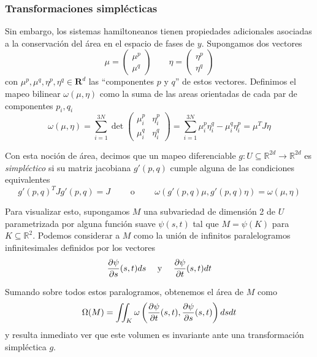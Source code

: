 \subsubsection{Transformaciones simplécticas}{\label{sec:trans_simp}}

Sin embargo, los sistemas hamiltoneanos tienen propiedades adicionales asociadas a la conservación del área en el espacio de fases de $y$. 
Supongamos dos vectores 
\[ \mu = \begin{pmatrix} \mu^p\\ \mu^q \end{pmatrix} \qquad \eta = \begin{pmatrix} \eta^p\\ \eta^q \end{pmatrix}  \]
con $\mu^p, \mu^q, \eta^p, \eta^q\in\mathbf{R}^{d}$ las ``componentes $p$ y $q$'' de estos vectores.
Definimos el mapeo bilinear $\omega(\mu,\eta)$ como la suma de las areas orientadas de cada par de componentes $p_i,q_i$ 
\begin{equation}
 \omega(\mu, \eta) = \sum_{i=1}^{3N} \det \begin{pmatrix} \mu^p_i & \eta^p_i \\ \mu^q_i & \eta^q_i \end{pmatrix} = \sum_{i=1}^{3N} \mu^p_i\eta^q_i - \mu^q_i\eta^p_i = \mu^T J \eta
\end{equation}

Con esta noción de área, decimos que un mapeo diferenciable $g:U\subseteq\mathbb{R}^{2d}\to\mathbb{R}^{2d}$ es \textit{simpléctico} si su matriz jacobiana $g'(p,q)$ cumple alguna de las condiciones
equivalentes \[ g'(p,q)^T J g'(p,q) = J \qquad \text{ o } \qquad \omega(g'(p,q)\mu, g'(p,q)\eta) = \omega(\mu, \eta) \]

Para visualizar esto, supongamos $M$ una subvariedad de dimensión 2 de $U$ parametrizada por alguna función suave $\psi(s,t)$ tal que $M=\psi(K)$ para $K\subseteq\mathbb{R}^2$.
Podemos considerar a $M$ como la unión de infinitos paralelogramos infinitesimales definidos por los vectores
\[ \frac{\partial\psi}{\partial s}(s,t)ds \quad \text{ y } \quad \frac{\partial\psi}{\partial t}(s,t)dt \]

Sumando sobre todos estos paralogramos, obtenemos el área de $M$ como
\begin{equation}{\label{eq:area_orien_simp}}
 \Omega(M) = \iint_K \omega\left(\frac{\partial\psi}{\partial t}(s,t), \frac{\partial\psi}{\partial s}(s,t)\right) ds dt
\end{equation}
y resulta inmediato ver que este volumen es invariante ante una transformación simpléctica $g$.


